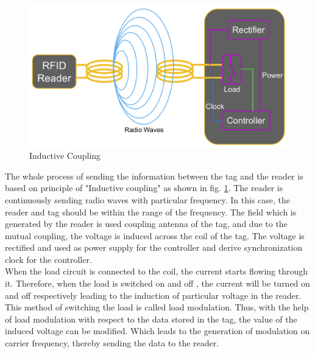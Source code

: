 \begin{figure}[!htbp]
	\centering
	\includegraphics[width = 13cm]{Pictures/rfidtotag}
	\caption{Inductive Coupling}
	\label{rfid_to_tag}
\end{figure}
The whole process of sending the information between the tag and the reader is based on principle of "Inductive coupling" as shown in fig. \ref{rfid_to_tag}.
The reader is continuously sending radio waves with particular frequency. In this case, the reader and tag should be within the range of the frequency. The field which is generated by the reader is used coupling antenna of the tag, and due to the mutual coupling, the voltage is induced across the coil of the tag. The voltage is rectified and used as power supply for the controller and derive synchronization clock for the controller.\\
When the load circuit is connected to the coil, the current starts flowing through it. Therefore, when the load is switched on and off , the current will be turned on and off respectively leading to the induction of particular voltage in the reader. This method of switching the load is called load modulation. Thus, with the help of load modulation with respect to the data stored in the tag, the value of the induced voltage can be modified. Which leads to the generation of modulation on carrier frequency, thereby sending the data to the reader.\\
